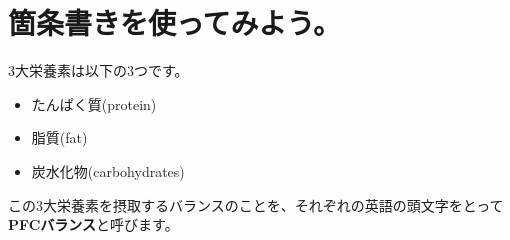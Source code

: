 \documentclass{ltjsarticle}
\begin{document}
\section{箇条書きを使ってみよう。}
3大栄養素は以下の3つです。
\begin{itemize}
\item
たんぱく質(protein)
\item
脂質(fat)
\item
炭水化物(carbohydrates)
\end{itemize}
この3大栄養素を摂取するバランスのことを、それぞれの英語の頭文字をとって\textbf{PFCバランス}と呼びます。
\end{document}
